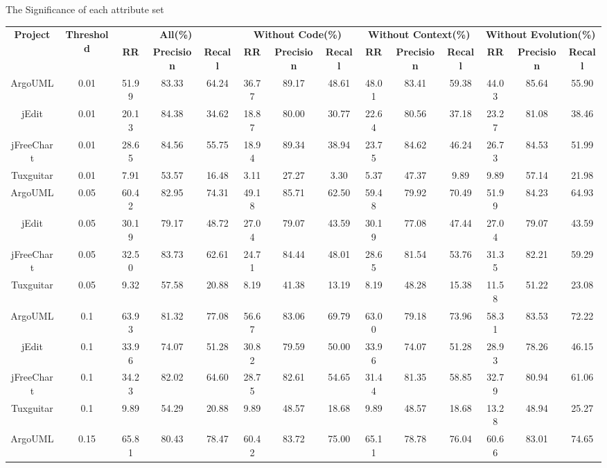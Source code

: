 {\begin{table}[htbp]
{The Significance of each attribute set}
\vspace{0.5em}
\centering
\wuhao
\begin{tabular}{cccccccccccccc}
\toprule[1.5pt]
\multirow{2}{*}{\textbf{Project}}&\multirow{2}{*}{\textbf{Threshold}}&\multicolumn{3}{|c|}{\textbf{All(\%)}}&\multicolumn{3}{|c|}{\textbf{Without Code(\%)}}&\multicolumn{3}{|c|}{\textbf{Without Context(\%)}}&\multicolumn{3}{|c|}{\textbf{Without Evolution(\%)}}\\
\cline{3-14}
&&\textbf{RR}&\textbf{Precision}&\textbf{Recall}&\textbf{RR}&\textbf{Precision}&\textbf{Recall}&\textbf{RR}&\textbf{Precision}&\textbf{Recall}&\textbf{RR}&\textbf{Precision}&\textbf{Recall}\\
\midrule[1pt]
ArgoUML&0.01&	51.99&	83.33&	64.24&	36.77&	89.17&	48.61&	48.01&	83.41&	59.38&	44.03&	85.64&	55.90\\
jEdit&0.01&	20.13&	84.38&	34.62&	18.87&	80.00&	30.77&	22.64&	80.56&	37.18&	23.27&	81.08&	38.46\\
jFreeChart&0.01& 28.65&	84.56&	55.75&	18.94&	89.34&	38.94&	23.75&	84.62&	46.24&	26.73&	84.53&	51.99\\
Tuxguitar&0.01&	7.91&	53.57&	16.48&	3.11&	27.27&	3.30&	5.37&	47.37&	9.89&	9.89&	57.14&	21.98\\
\hline
ArgoUML&0.05&	60.42&	82.95&	74.31&	49.18&	85.71&	62.50&	59.48&	79.92&	70.49&	51.99&	84.23&	64.93\\
jEdit&0.05&	30.19&	79.17&	48.72&	27.04&	79.07&	43.59&	30.19&	77.08&	47.44&	27.04&	79.07&	43.59\\
jFreeChart&0.05&	32.50&	83.73&	62.61&	24.71&	84.44&	48.01&	28.65&	81.54&	53.76&	31.35&	82.21&	59.29\\
Tuxguitar&0.05&	9.32&	57.58&	20.88&	8.19&	41.38&	13.19&	8.19&	48.28&	15.38&	11.58&	51.22&	23.08\\
\hline
ArgoUML&0.1&	63.93&	81.32&	77.08&	56.67&	83.06&	69.79&	63.00&	79.18&	73.96&	58.31&	83.53&	72.22\\
jEdit&0.1&	33.96&	74.07&	51.28&	30.82&	79.59&	50.00&	33.96&	74.07&	51.28&	28.93&	78.26&	46.15\\
jFreeChart&0.1&	34.23&	82.02&	64.60&	28.75&	82.61&	54.65&	31.44&	81.35&	58.85&	32.79&	80.94&	61.06\\
Tuxguitar&0.1&	9.89&	54.29&	20.88&	9.89&	48.57&	18.68&	9.89&	48.57&	18.68&	13.28&	48.94&	25.27\\
\hline
ArgoUML&0.15&	65.81&	80.43&	78.47&	60.42&	83.72&	75.00&	65.11&	78.78&	76.04&	60.66&	83.01&	74.65\\

\end{tabular}
\end{table}}
